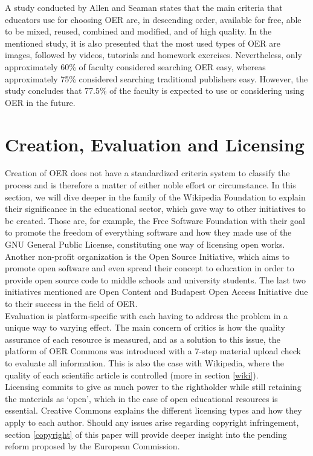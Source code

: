 \documentclass[a4paper]{article}
\begin{document}
\noindent
A study conducted by Allen and Seaman \cite{ed-usa} states that the main criteria that educators use for choosing OER are, in descending order, available for free, able to be mixed, reused, combined and modified, and of high quality. In the mentioned study, it is also presented that the most used types of OER are images, followed by videos, tutorials and homework exercises. Nevertheless, only approximately 60\% of faculty considered searching OER easy, whereas approximately 75\% considered searching traditional publishers easy. However, the study concludes that 77.5\% of the faculty is expected to use or considering using OER in the future.

\section{Creation, Evaluation and Licensing} 

Creation of OER does not have a standardized criteria system to classify the process and is therefore a matter of either noble effort or circumstance. In this section, we will dive deeper in the family of the Wikipedia Foundation to explain their significance in the educational sector, which gave way to other initiatives to be created. Those are, for example, the Free Software Foundation with their goal to promote the freedom of everything software and how they made use of the GNU General Public License, constituting one way of licensing open works. Another non-profit organization is the Open Source Initiative, which aims to promote open software and even spread their concept to education in order to provide open source code to middle schools and university students. The last two initiatives mentioned are Open Content and Budapest Open Access Initiative due to their success in the field of OER. \\

\noindent
Evaluation is platform-specific with each having to address the problem in a unique way to varying effect. The main concern of critics is how the quality assurance of each resource is measured, and as a solution to this issue, the platform of OER Commons was introduced with a 7-step material upload check to evaluate all information. This is also the case with Wikipedia, where the quality of each scientific article is controlled (more in section \ref{wiki}). \\

\noindent
Licensing commits to give as much power to the rightholder while still retaining the materials as `open', which in the case of open educational resources is essential. Creative Commons explains the different licensing types and how they apply to each author. Should any issues arise regarding copyright infringement, section \ref{copyright} of this paper will provide deeper insight into the pending reform proposed by the European Commission. \\
\end{document}
